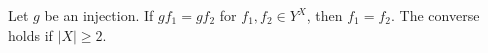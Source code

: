 Let $g$ be an injection. If $gf_1 = gf_2$ for $f_1, f_2 \in Y^X$, then $f_1 = f_2$. The converse holds if $|X| \geq 2$.
